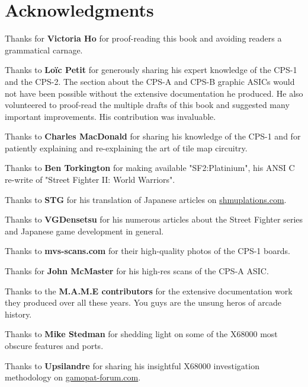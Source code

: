 \chapter*{Acknowledgments} 

Thanks for \textbf{Victoria Ho} for proof-reading this book and avoiding readers a grammatical carnage.

Thanks to \textbf{Lo\"{i}c Petit} for generously sharing his expert knowledge of the CPS-1 and the CPS-2. The section about the CPS-A and CPS-B graphic ASICs would not have been possible without the extensive documentation he produced. He also volunteered to proof-read the multiple drafts of this book and suggested many important improvements. His contribution was invaluable.

Thanks to \textbf{Charles MacDonald} for sharing his knowledge of the CPS-1 and for patiently explaining and re-explaining the art of tile map circuitry.

Thanks to \textbf{Ben Torkington} for making available "SF2:Platinium", his ANSI C re-write of "Street Fighter II: World Warriors".

Thanks to \textbf{STG} for his translation of Japanese articles on \href{https://shmuplations.com}{shmuplations.com}.

Thanks to \textbf{VGDensetsu} for his numerous articles about the Street Fighter series and Japanese game development in general.

Thanks to \textbf{mvs-scans.com} for their high-quality photos of the CPS-1 boards.

Thanks for \textbf{John McMaster} for his high-res scans of the CPS-A ASIC.

Thanks to the \textbf{M.A.M.E contributors} for the extensive documentation work they produced over all these years. You guys are the unsung heros of arcade history.

Thanks to \textbf{Mike Stedman} for shedding light on some of the X68000 most obscure features and ports.

Thanks to \textbf{Upsilandre} for sharing his insightful X68000 investigation methodology on \href{https://www.gamopat-forum.com}{gamopat-forum.com}.